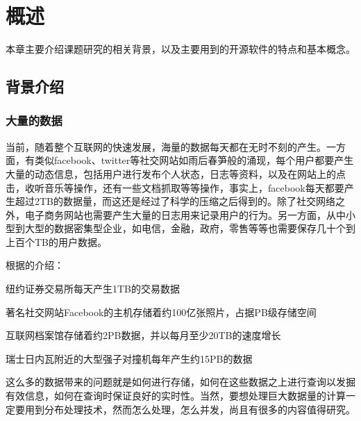 \chapter{概述}
本章主要介绍课题研究的相关背景，以及主要用到的开源软件的特点和基本概念。
\section{背景介绍}

\subsection{大量的数据}
  当前，随着整个互联网的快速发展，海量的数据每天都在无时不刻的产生。一方面，有类似facebook、twitter等社交网站如雨后春笋般的涌现，每个用户都要产生大量的动态信息，包括用户进行发布个人状态，日志等资料，以及在网站上的点击，收听音乐等操作，还有一些文档抓取等等操作，事实上，facebook每天都要产生超过2TB的数据量，而这还是经过了科学的压缩之后得到的。除了社交网络之外，电子商务网站也需要产生大量的日志用来记录用户的行为。另一方面，从中小型到大型的数据密集型企业，如电信，金融，政府，零售等等也需要保存几十个到上百个TB的用户数据。


根据\cite{HadoopGuide}的介绍：
\begin{compactitem}
\item 纽约证券交易所每天产生1TB的交易数据
\item 著名社交网站Facebook的主机存储着约100亿张照片，占据PB级存储空间
\item 互联网档案馆存储着约2PB数据，并以每月至少20TB的速度增长
\item 瑞士日内瓦附近的大型强子对撞机每年产生约15PB的数据
\end{compactitem}
这么多的数据带来的问题就是如何进行存储，如何在这些数据之上进行查询以发掘有效信息，如何在查询时保证良好的实时性。当然，要想处理巨大数据量的计算一定要用到分布处理技术，然而怎么处理，怎么并发，尚且有很多的内容值得研究。

